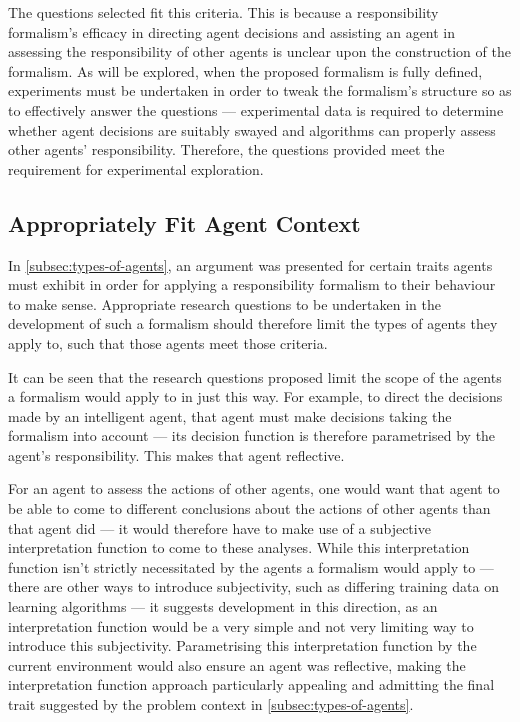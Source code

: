 The questions selected fit this criteria. This is because a responsibility formalism's efficacy in directing agent decisions and assisting an agent in assessing the responsibility of other agents is unclear upon the construction of the formalism. As will be explored, when the proposed formalism is fully defined, experiments must be undertaken in order to tweak the formalism's structure so as to effectively answer the questions --- experimental data is required to determine whether agent decisions are suitably swayed and algorithms can properly assess other agents' responsibility. Therefore, the questions provided meet the requirement for experimental exploration.\par

\subsection{Appropriately Fit Agent Context}
In \cref{subsec:types-of-agents}, an argument was presented for certain traits agents must exhibit in order for applying a responsibility formalism to their behaviour to make sense. Appropriate research questions to be undertaken in the development of such a formalism should therefore limit the types of agents they apply to, such that those agents meet those criteria.\par

It can be seen that the research questions proposed limit the scope of the agents a formalism would apply to in just this way. For example, to direct the decisions made by an intelligent agent, that agent must make decisions taking the formalism into account --- its decision function is therefore parametrised by the agent's responsibility. This makes that agent reflective. \par

For an agent to assess the actions of other agents, one would want that agent to be able to come to different conclusions about the actions of other agents than that agent did --- it would therefore have to make use of a subjective interpretation function to come to these analyses. While this interpretation function isn't strictly necessitated by the agents a formalism would apply to --- there are other ways to introduce subjectivity, such as differing training data on learning algorithms --- it suggests development in this direction, as an interpretation function would be a very simple and not very limiting way to introduce this subjectivity. Parametrising this interpretation function by the current environment would also ensure an agent was reflective, making the interpretation function approach particularly appealing and admitting the final trait suggested by the problem context in \cref{subsec:types-of-agents}.\par

